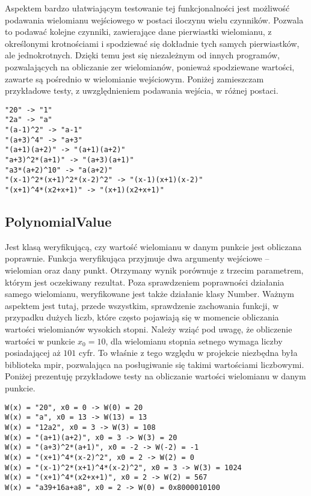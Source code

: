 \documentclass[twoside,a4paper]{book}
\begin{document}
Aspektem bardzo ułatwiającym testowanie tej funkcjonalności jest możliwość podawania wielomianu wejściowego w postaci iloczynu wielu czynników. Pozwala to podawać kolejne czynniki, zawierające dane pierwiastki wielomianu, z określonymi krotnościami i spodziewać się dokładnie tych samych pierwiastków, ale jednokrotnych. Dzięki temu jest się niezależnym od innych programów, pozwalających na obliczanie zer wielomianów, ponieważ spodziewane wartości, zawarte są pośrednio w wielomianie wejściowym. Poniżej zamieszczam przykładowe testy, z uwzględnieniem podawania wejścia, w różnej postaci.

\begin{lstlisting}
"20" -> "1"
"2a" -> "a"
"(a-1)^2" -> "a-1"
"(a+3)^4" -> "a+3"
"(a+1)(a+2)" -> "(a+1)(a+2)"
"a+3)^2*(a+1)" -> "(a+3)(a+1)"
"a3*(a+2)^10" -> "a(a+2)"
"(x-1)^2*(x+1)^2*(x-2)^2" -> "(x-1)(x+1)(x-2)"
"(x+1)^4*(x2+x+1)" -> "(x+1)(x2+x+1)"
\end{lstlisting}

\subsection{PolynomialValue}

Jest klasą weryfikującą, czy wartość wielomianu w danym punkcie jest obliczana poprawnie. Funkcja weryfikująca przyjmuje dwa argumenty wejściowe – wielomian oraz dany punkt. Otrzymany wynik porównuje z trzecim parametrem, którym jest oczekiwany rezultat. Poza sprawdzeniem poprawności działania samego wielomianu, weryfikowane jest także działanie klasy Number. Ważnym aspektem jest tutaj, przede wszystkim, sprawdzenie zachowania funkcji, w przypadku dużych liczb, które często pojawiają się w momencie obliczania wartości wielomianów wysokich stopni. Należy wziąć pod uwagę, że obliczenie wartości w punkcie $x_0=10$, dla wielomianu stopnia setnego wymaga liczby posiadającej aż $101$ cyfr. To właśnie z tego względu w projekcie niezbędna była biblioteka mpir, pozwalająca na posługiwanie się takimi wartościami liczbowymi. Poniżej prezentuję przykładowe testy na obliczanie wartości wielomianu w danym punkcie.

\begin{lstlisting}
W(x) = "20", x0 = 0 -> W(0) = 20
W(x) = "a", x0 = 13 -> W(13) = 13
W(x) = "12a2", x0 = 3 -> W(3) = 108
W(x) = "(a+1)(a+2)", x0 = 3 -> W(3) = 20
W(x) = "(a+3)^2*(a+1)", x0 = -2 -> W(-2) = -1
W(x) = "(x+1)^4*(x-2)^2", x0 = 2 -> W(2) = 0
W(x) = "(x-1)^2*(x+1)^4*(x-2)^2", x0 = 3 -> W(3) = 1024
W(x) = "(x+1)^4*(x2+x+1)", x0 = 2 -> W(2) = 567
W(x) = "a39+16a+a8", x0 = 2 -> W(0) = 0x8000010100
\end{lstlisting}
\end{document}
